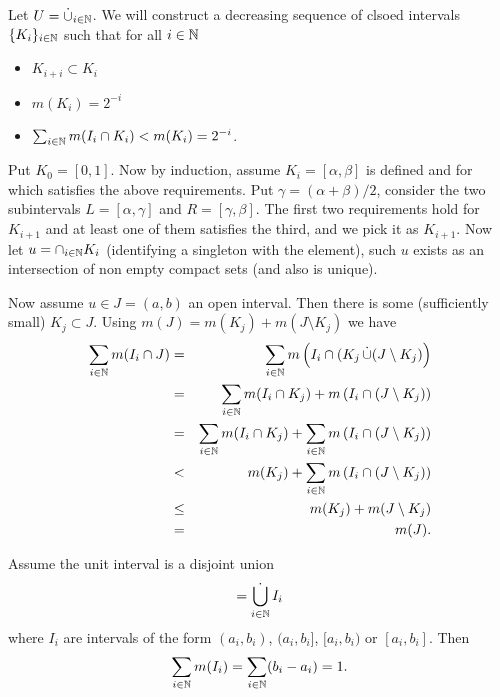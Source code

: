 \begin{thmproof}
Let \(U = \disjunion_{i\in\N}\).
We will construct a decreasing sequence of clsoed intervals \(\{K_i\}_{i\in\mathbb{N}}\)
such that for all \(i\in\mathbb{N}\)
\begin{itemize}
 \item \(K_{i+i} \subset K_i\)
 \item \(m(K_i) = 2^{-i}\)
 \item \(\sum_{i\in\mathbb{N}} m(I_i\cap K_i) < m(K_i) = 2^{-i}\).
\end{itemize}
Put \(K_0 = [0,1]\). Now by induction, assume \(K_i = [\alpha,\beta]\)
is defined and for which satisfies the above requirements.
Put \(\gamma = (\alpha+\beta)/2\), consider the two subintervals
\(L=[\alpha,\gamma]\) and
\(R=[\gamma,\beta]\). The first two requirements hold for \(K_{i+1}\)
and at least one of them satisfies the third, and we pick it as \(K_{i+1}\).
Now let \(u = \cap_{i\in\mathbb{N}} K_i\) (identifying a singleton with the element),
such $u$ exists as an intersection of non empty compact sets (and also is
unique).

Now assume \(u\in J = (a,b)\) an open interval.
Then there is some (sufficiently small) \(K_j \subset J\).
Using \(m(J) = m(K_j) + m(J\setminus K_j)\) we have
\begin{eqnarray*}
 \sum_{i\in\N} m(I_i \cap J)
 &=& \sum_{i\in\N} m\left(I_i \cap (K_j \disjunion (J\setminus K_j)\right) \\
 &=& \sum_{i\in\N} {   m(I_i \cap K_j)
                     + m\left(I_i \cap (J\setminus K_j)\right)} \\
 &=& \sum_{i\in\N} m(I_i \cap K_j) +
     \sum_{i\in\N} m\left(I_i \cap (J\setminus K_j)\right) \\
 &<&     m(K_j) + \sum_{i\in\N} m\left(I_i \cap (J\setminus K_j)\right) \\
 &\leq&  m(K_j) + m(J\setminus K_j) \\
 &=& m(J).
\end{eqnarray*}
\end{thmproof}


\begin{llem} \label{llem:sumintervals:}
Assume the unit interval is a disjoint union
\begin{equation*}
 [0,1] = \Disjunion_{i\in\N} I_i
\end{equation*}
where \(I_i\) are intervals of the form
\((a_i,b_i)\),
\((a_i,b_i]\),
\([a_i,b_i)\) or
\([a_i,b_i]\). Then
\begin{equation*}
 \sum_{i\in\mathbb{N}} m(I_i) =  \sum_{i\in\mathbb{N}} (b_i - a_i)= 1.
\end{equation*}
\end{llem}


